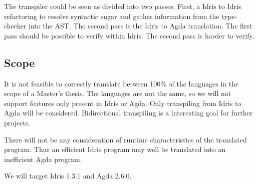 
The transpiler could be seen as divided into two passes. First, a Idris to
Idris refactoring to resolve syntactic sugar and gather information from the
type-checker into the AST. The second pass is the Idris to Agda translation.
The first pass should be possible to verify within Idris. The second pass is
harder to verify.



\subsection{Scope}

It is not feasible to correctly translate between 100\% of the
languages in the scope of a Master's thesis.  The languages are not the same,
so we will not support features only present in Idris or Agda.  Only
transpiling from Idris to Agda will be considered. Bidirectional transpiling is
a interesting goal for further projects.


There will not be any consideration of runtime characteristics of the
translated program.
Thus an efficient Idris program may well be translated into an inefficient Agda program.

We will target Idris 1.3.1 and Agda 2.6.0.


